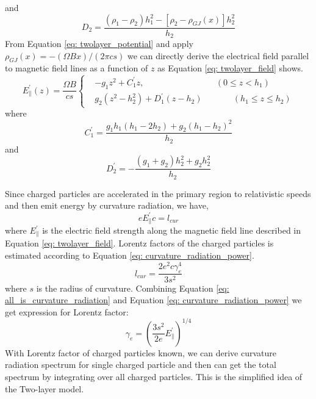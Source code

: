 \documentclass[12pt]{report}
\begin{document}
      and 
      \begin{equation*}
        D_{2} = \frac{\left(\rho_1-\rho_2\right)h_1^2-\left[\rho_2-\rho_{GJ}\left(x\right)\right]h_2^2}{h_2}
      \end{equation*}
      From Equation \ref{eq: twolayer_potential} and apply 
      $\rho_{GJ}\left(x\right)=-\left(\Omega B x\right)/\left(2\pi cs\right)$ 
      we can directly derive the electrical field parallel to magnetic field lines as a 
      function of $z$ as Equation \ref{eq: twolayer_field} shows.
      \begin{equation}
        \label{eq: twolayer_field}
          E^{\prime}_{\parallel}\left(z\right) = \frac{\Omega B}{cs}
          \left\{\begin{alignedat}{2}
             & -g_1 z^2 + C_1^{\prime}z ,  &&\left(0 \leq z < h_{1}\right) \\
             & g_2\left(z^2 - h_2^2\right) + D_1^{\prime}\left(z-h_2\right)  &&\qquad \left(h_{1} \leq z \leq h_{2}\right) 
          \end{alignedat}\right.
      \end{equation}
      where 
      \begin{equation*}
        C_{1}^{\prime} = \frac{g_1 h_1 \left(h_1 - 2h_2\right)+ g_2\left(h_1-h_2\right)^2}{h_2}  
      \end{equation*}
      and 
      \begin{equation*}
        D_{2}^{\prime} = -\frac{\left(g_1 + g_2\right)h_2^2 + g_2 h_2^2}{h_2}
      \end{equation*}

      Since charged particles are accelerated in the primary region to relativistic speeds 
      and then emit energy by curvature radiation, we have,
      \begin{equation}
        \label{eq: all_is_curvature_radiation}
        e E_{\parallel}^{\prime} c = l_{cur}
      \end{equation}
      where $E_\parallel^{\prime}$ is the electric field strength along the magnetic field 
      line described in Equation \ref{eq: twolayer_field}.
      Lorentz factors of the charged particles is estimated according to Equation 
      \ref{eq: curvature_radiation_power}.
      \begin{equation}
        \label{eq: curvature_radiation_power}
        l_{cur} = \frac{2 e^2 c \gamma^{4}_{e}}{3s^2}
      \end{equation}      
      where $s$ is the radius of curvature. 
      Combining Equation \ref{eq: all_is_curvature_radiation} and Equation
      \ref{eq: curvature_radiation_power} we get expression for Lorentz factor: 
      \begin{equation}
        \label{eq: gamma_can_be_zero}
        \gamma_{e} = \left(\frac{3s^2}{2e} E_{\parallel}^{\prime}\right)^{1/4}
      \end{equation}
      With Lorentz factor of charged particles known, we can derive curvature radiation 
      spectrum for single charged particle and then can get the total spectrum by integrating 
      over all charged particles. This is the simplified idea of the Two-layer model. 
\end{document}
